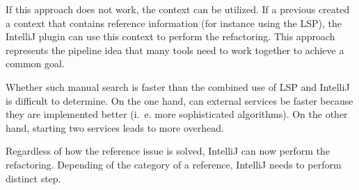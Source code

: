 If this approach does not work, the context can be utilized. If a previous created a context that contains reference information (for instance using the \ac{LSP}), the IntelliJ plugin can use this context to perform the refactoring. This approach represents the pipeline idea that many tools need to work together to achieve a common goal.


Whether such manual search is faster than the combined use of \ac{LSP} and IntelliJ is difficult to determine. On the one hand, can external services be faster because they are implemented better (i.~e. more sophisticated algorithms). On the other hand, starting two services leads to more overhead. 



Regardless of how the reference issue is solved, IntelliJ can now perform the refactoring. Depending of the category of a reference, IntelliJ needs to perform distinct step. 
